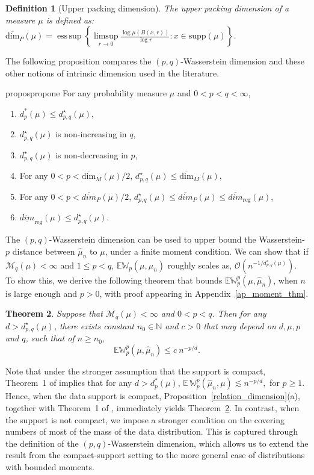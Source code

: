 \documentclass[12pts]{article}
\newtheorem{defn}{Definition}%
\newtheorem{theorem}[defn]{Theorem}%
\newcommand{\cO}{ \mathcal{O}}
\newcommand{\sM}{ \mathscr{M}}
\newcommand{\hmu}{\hat{\mu}}
\newcommand{\E}{\mathbb{E}}
\newcommand{\fN}{\mathbb{N}}
\newcommand{\fW}{\mathbb{W}}
\begin{document}
\begin{defn}[Upper packing dimension] \normalfont The upper packing dimension of a measure $\mu$ is defined as:
    $\overline{\text{dim}}_P(\mu) = \operatorname{ess\, sup} \left\{\limsup\limits_{r \rightarrow 0} \frac{\log \mu(B(x,r))}{\log r}: x \in \text{supp}(\mu)\right\}$.
\end{defn}
The following proposition compares the $(p,q)$-Wasserstein dimension and these other notions of intrinsic dimension used in the literature.
\begin{restatable}{propos}{propone}\label{relation_dimension}
    For any probability measure $\mu$ and $0< p < q < \infty$,
    \begin{enumerate}
        \item[(a)] $d^\ast_p(\mu) \le d^\star_{p,q}(\mu)$,
        \item [(b)] $d^\star_{p,q}(\mu) $ is non-increasing in $q$,
        \item[(c)] $d^\star_{p,q}(\mu) $ is non-decreasing in $p$,
        \item[(d)] For any $0 < p < \overline{\text{dim}}_M(\mu)/2$, $d^\star_{p,q}(\mu) \le \overline{\text{dim}}_M(\mu)$,
        \item[(e)] For any $0 < p < \overline{dim}_P(\mu)/2  $, $d^\star_{p,q}(\mu) \le \overline{dim}_P(\mu) \le \overline{dim}_{\text{reg}}(\mu)$,
        \item[(f)] $\underline{dim}_{\text{reg}}(\mu) \le d^\star_{p,q}(\mu)$.
    \end{enumerate}
\end{restatable}

The $(p, q)$-Wasserstein dimension can be used to upper bound the Wasserstein-$p$ distance between $\hmu_n$ to $\mu$, under a finite moment condition. We can show that if $\sM_q(\mu) < \infty$ and $ 1\le p < q$, $\E\fW_p(\mu, \hmu_n)$ roughly scales as, $\cO\left(n^{-1/d^\star_{p,q}(\mu)}\right)$. To show this, we derive the following theorem that bounds $\E \fW^p_p(\mu, \hmu_n)$, when $n$ is large enough and $p > 0$, with proof appearing in Appendix~\ref{ap_moment_thm}. 

\begin{theorem}\label{moment_thm}
     Suppose that $\sM_q(\mu) < \infty$ and $0 < p < q$. Then for any $d > d^\star_{p, q}(\mu)$, there exists constant $n_0\in \fN$ and $c >0$ that may depend on $d, \mu, p$ and $q$, such that of $n \ge n_0$,
     \[\E \fW^p_p(\mu, \hmu_n) \le c \ n^{-p/d}.\]
 \end{theorem}
 Note that under the stronger assumption that the support is compact, Theorem~1 of \citet{weed2019sharp} implies that for any $d > d_p^\ast(\mu)$,
\(\mathbb{E}\,\fW_p^p(\hat{\mu}_n,\mu) \lesssim n^{-p/d},\) for $ p \ge 1.$ Hence, when the data support is compact, Proposition~\ref{relation_dimension}(a), together with Theorem~1 of \citet{weed2019sharp}, immediately yields Theorem~\ref{moment_thm}. In contrast, when the support is not compact, we impose a stronger condition on the covering numbers of most of the mass of the data distribution. This is captured through the definition of the $(p,q)$-Wasserstein dimension, which allows us to extend the result from the compact-support setting to the more general case of distributions with bounded moments.
\end{document}
